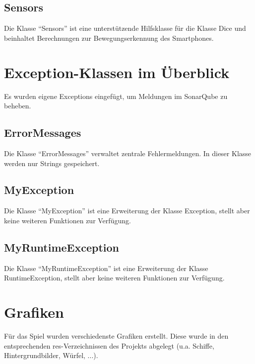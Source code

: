 \documentclass[11pt]{article} %
\begin{document}
\subsection{Sensors}
Die Klasse \enquote{Sensors} ist eine unterstützende Hilfsklasse für die Klasse Dice und beinhaltet Berechnungen zur Bewegungserkennung des Smartphones.

\section{Exception-Klassen im Überblick}
Es wurden eigene Exceptions eingefügt, um Meldungen im SonarQube zu beheben.

\subsection{ErrorMessages}
Die Klasse \enquote{ErrorMessages} verwaltet zentrale Fehlermeldungen. In dieser Klasse werden nur Strings gespeichert.

\subsection{MyException}
Die Klasse \enquote{MyException} ist eine Erweiterung der Klasse Exception, stellt aber keine weiteren Funktionen zur Verfügung.

\subsection{MyRuntimeException}
Die Klasse \enquote{MyRuntimeException} ist eine Erweiterung der Klasse RuntimeException, stellt aber keine weiteren Funktionen zur Verfügung.

\section{Grafiken}
Für das Spiel wurden verschiedenste Grafiken erstellt. Diese wurde in den entsprechenden res-Verzeichnissen des Projekts abgelegt (u.a. Schiffe, Hintergrundbilder, Würfel, ...).

\newpage
\end{document}
